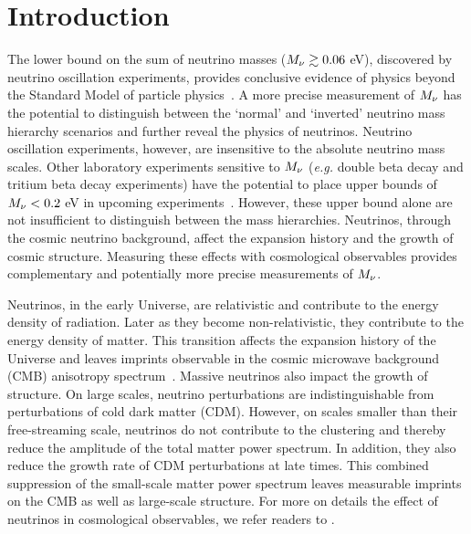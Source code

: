 \section{Introduction}
The lower bound on the sum of neutrino masses ($M_\nu \gtrsim 0.06$ eV), 
discovered by neutrino oscillation experiments, provides conclusive evidence of 
physics beyond the Standard Model of particle physics~\citep{forero2014, gonzalez-garcia2016}. 
A more precise measurement of $M_\nu$ has the potential to distinguish 
between the `normal' and `inverted' neutrino mass hierarchy scenarios 
and further reveal the physics of neutrinos. Neutrino oscillation 
experiments, however, are insensitive to the absolute neutrino mass scales. 
Other laboratory experiments sensitive to $M_\nu$ (\emph{e.g.} double beta 
decay and tritium beta decay experiments) have the potential to place upper 
bounds of $M_\nu < 0.2$ eV in upcoming experiments~\citep{bonn2011, drexlin2013}. 
However, these upper bound alone are not insufficient to distinguish between the mass
hierarchies. Neutrinos, through the cosmic neutrino background, affect the 
expansion history and the growth of cosmic structure. Measuring these effects 
with cosmological observables provides complementary and potentially more 
precise measurements of $M_\nu$. 

Neutrinos, in the early Universe, are relativistic and contribute to the 
energy density of radiation. Later as they become non-relativistic, 
they contribute to the energy density of matter. This transition affects 
the expansion history of the Universe and leaves imprints observable in 
the cosmic microwave background (CMB) anisotropy spectrum~\citep{lesgourgues2012, lesgourgues2014}. 
Massive neutrinos also impact the growth of structure. On large scales, 
neutrino perturbations are indistinguishable from perturbations of cold 
dark matter (CDM). However, on scales smaller than their free-streaming 
scale, neutrinos do not contribute to the clustering and thereby reduce 
the amplitude of the total matter power spectrum. In addition, they also reduce the growth 
rate of CDM perturbations at late times. This combined suppression of 
the small-scale matter power spectrum leaves measurable imprints 
on the CMB as well as large-scale structure. For more on details the effect
of neutrinos in cosmological observables, we refer readers to 
\cite{lesgourgues2012,lesgourgues2014,gerbino2018}. 

